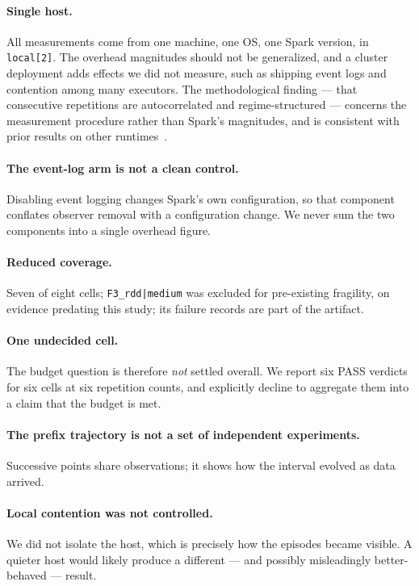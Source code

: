 \documentclass[sigconf,review,anonymous]{acmart}
\newcommand{\cell}[1]{\texttt{#1}}
\begin{document}
\paragraph{Single host.} All measurements come from one machine, one OS, one Spark version, in
\texttt{local[2]}. The overhead magnitudes should not be generalized, and a cluster deployment adds
effects we did not measure, such as shipping event logs and contention among many executors. The
methodological finding --- that consecutive repetitions are autocorrelated and regime-structured ---
concerns the measurement procedure rather than Spark's magnitudes, and is consistent with prior
results on other runtimes~\cite{barrett2017warmup,laaber2019software}.

\paragraph{The event-log arm is not a clean control.} Disabling event logging changes Spark's own
configuration, so that component conflates observer removal with a configuration change. We
never sum the two components into a single overhead figure.

\paragraph{Reduced coverage.} Seven of eight cells; \cell{F3\_rdd|medium} was excluded for pre-existing
fragility, on evidence predating this study; its failure records are part of the artifact.

\paragraph{One undecided cell.} The budget question is therefore \emph{not} settled overall. We report six
PASS verdicts for six cells at six repetition counts, and explicitly decline to aggregate them
into a claim that the budget is met.

\paragraph{The prefix trajectory is not a set of independent experiments.} Successive points share
observations; it shows how the interval evolved as data arrived.

\paragraph{Local contention was not controlled.} We did not isolate the host, which is precisely how the
episodes became visible. A quieter host would likely produce a different --- and possibly
misleadingly better-behaved --- result.
\end{document}
